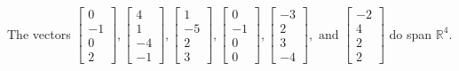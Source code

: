 \begin{exercise}
\begin{exerciseStatement}
  \end{exerciseStatement}
  \begin{exerciseAnswer}
   The vectors \(\left[\begin{array}{r}
0 \\
-1 \\
0 \\
2
\end{array}\right] , \left[\begin{array}{r}
4 \\
1 \\
-4 \\
-1
\end{array}\right] , \left[\begin{array}{r}
1 \\
-5 \\
2 \\
3
\end{array}\right] , \left[\begin{array}{r}
0 \\
-1 \\
0 \\
0
\end{array}\right] , \left[\begin{array}{r}
-3 \\
2 \\
3 \\
-4
\end{array}\right] , \text{ and } \left[\begin{array}{r}
-2 \\
4 \\
2 \\
2
\end{array}\right]\) 
  	 do  
	span \(\mathbb{R}^4\).
  


  \end{exerciseAnswer}
\end{exercise}
